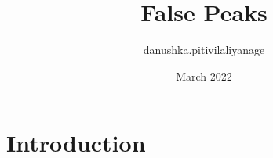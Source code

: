 \documentclass{article}
\title{False Peaks}
\author{danushka.pitivilaliyanage }
\date{March 2022}
\begin{document}
\maketitle

\section{Introduction}
\end{document}
